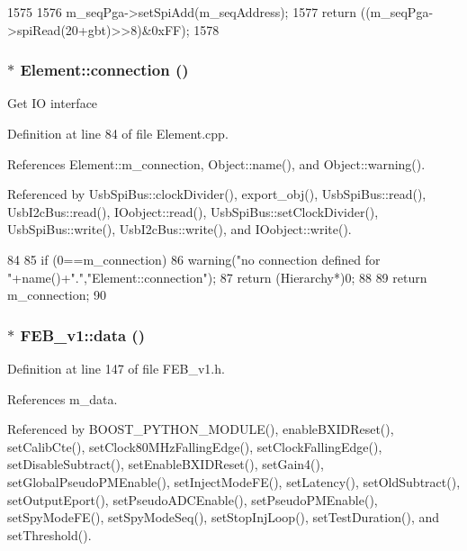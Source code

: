 \begin{DoxyCode}
1575                                    {
1576   m_seqPga->setSpiAdd(m_seqAddress);
1577   return ((m_seqPga->spiRead(20+gbt)>>8)&0xFF);
1578 }
\end{DoxyCode}
\hypertarget{classElement_af57444353c1ddf9fa0109801e97debf7}{
\subsubsection[{connection}]{ $\ast$ Element::connection ()}}
\label{classElement_af57444353c1ddf9fa0109801e97debf7}
Get IO interface 

Definition at line 84 of file Element.cpp.

References Element::m\_\-connection, Object::name(), and Object::warning().

Referenced by UsbSpiBus::clockDivider(), export\_\-obj(), UsbSpiBus::read(), UsbI2cBus::read(), IOobject::read(), UsbSpiBus::setClockDivider(), UsbSpiBus::write(), UsbI2cBus::write(), and IOobject::write().


\begin{DoxyCode}
84                               {
85   if (0==m_connection){
86     warning("no connection defined for "+name()+".","Element::connection");
87     return (Hierarchy*)0;
88   }
89   return m_connection;
90 }
\end{DoxyCode}
\hypertarget{classFEB__v1_a6bca4320bd3bbbc32efc81097f33421a}{
\subsubsection[{data}]{$\ast$ FEB\_\-v1::data ()}}
\label{classFEB__v1_a6bca4320bd3bbbc32efc81097f33421a}


Definition at line 147 of file FEB\_\-v1.h.

References m\_\-data.

Referenced by BOOST\_\-PYTHON\_\-MODULE(), enableBXIDReset(), setCalibCte(), setClock80MHzFallingEdge(), setClockFallingEdge(), setDisableSubtract(), setEnableBXIDReset(), setGain4(), setGlobalPseudoPMEnable(), setInjectModeFE(), setLatency(), setOldSubtract(), setOutputEport(), setPseudoADCEnable(), setPseudoPMEnable(), setSpyModeFE(), setSpyModeSeq(), setStopInjLoop(), setTestDuration(), and setThreshold().


